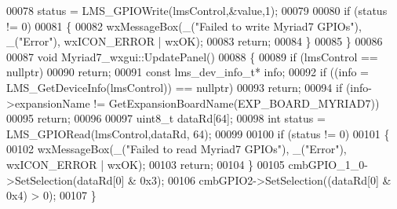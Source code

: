 \begin{DoxyCode}
00078     status = LMS_GPIOWrite(lmsControl,&value,1);
00079 
00080     \textcolor{keywordflow}{if} (status != 0)
00081     \{
00082         wxMessageBox(\_(\textcolor{stringliteral}{"Failed to write Myriad7 GPIOs"}), \_(\textcolor{stringliteral}{"Error"}), wxICON\_ERROR | wxOK);
00083         \textcolor{keywordflow}{return};
00084     \}
00085 \}
00086 
00087 \textcolor{keywordtype}{void} Myriad7_wxgui::UpdatePanel()
00088 \{
00089     \textcolor{keywordflow}{if} (lmsControl == \textcolor{keyword}{nullptr})
00090         \textcolor{keywordflow}{return};
00091     \textcolor{keyword}{const} lms_dev_info_t* info;
00092     \textcolor{keywordflow}{if} ((info = LMS_GetDeviceInfo(lmsControl)) == \textcolor{keyword}{nullptr})
00093         \textcolor{keywordflow}{return};
00094     \textcolor{keywordflow}{if} (info->expansionName != GetExpansionBoardName(EXP_BOARD_MYRIAD7))
00095             \textcolor{keywordflow}{return};
00096 
00097     uint8\_t dataRd[64];
00098     \textcolor{keywordtype}{int} status = LMS_GPIORead(lmsControl,dataRd, 64);
00099 
00100     \textcolor{keywordflow}{if} (status != 0)
00101     \{
00102         wxMessageBox(\_(\textcolor{stringliteral}{"Failed to read Myriad7 GPIOs"}), \_(\textcolor{stringliteral}{"Error"}), wxICON\_ERROR | wxOK);
00103         \textcolor{keywordflow}{return};
00104     \}
00105     cmbGPIO\_1\_0->SetSelection(dataRd[0] & 0x3);
00106     cmbGPIO2->SetSelection((dataRd[0] & 0x4) > 0);
00107 \}
\end{DoxyCode}
